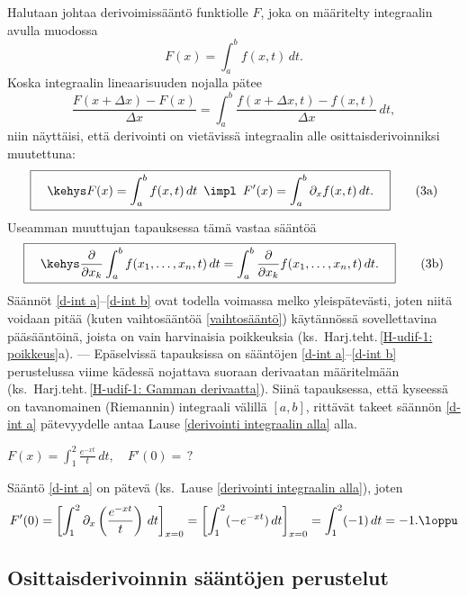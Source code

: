 Halutaan johtaa derivoimissääntö funktiolle $F$, joka on määritelty integraalin avulla muodossa
\[
F(x) = \int_a^b f(x,t)\,dt.
\]
Koska integraalin lineaarisuuden nojalla pätee
\[
\frac{F(x+\Delta x)-F(x)}{\Delta x} = \int_a^b \frac{f(x+\Delta x,t)-f(x,t)}{\Delta x}\,dt,
\]
niin näyttäisi, että derivointi on vietävissä integraalin alle osittaisderivoinniksi 
muutettuna:
\begin{equation} \label{d-int a}
\boxed{\quad\kehys F(x) =\int_a^b f(x,t)\,dt\,\ \impl\,\ 
                   F'(x)=\int_a^b \partial_x f(x,t)\,dt. \quad} \tag{3a}
\end{equation}
Useamman muuttujan tapauksessa tämä vastaa sääntöä
\begin{equation} \label{d-int b}
\boxed{\quad\kehys \frac{\partial}{\partial x_k}\int_a^b f(x_1,\ldots,x_n,t)\,dt 
              = \int_a^b \frac{\partial}{\partial x_k}f(x_1,\ldots,x_n,t)\,dt. \quad} \tag{3b}
\end{equation}
Säännöt \eqref{d-int a}--\eqref{d-int b} ovat todella voimassa melko yleispätevästi, joten
niitä voidaan pitää (kuten vaihtosääntöä \eqref{vaihtosääntö}) käytännössä sovellettavina
pääsääntöinä, joista on vain harvinaisia poikkeuksia 
(ks.\ Harj.teht.\,\ref{H-udif-1: poikkeus}a). --- Epäselvissä tapauksissa on sääntöjen
\eqref{d-int a}--\eqref{d-int b} perustelussa viime kädessä nojattava suoraan derivaatan
määritelmään (ks.\ Harj.teht.\,\ref{H-udif-1: Gamman derivaatta}). Siinä tapauksessa, että
kyseessä on tavanomainen (Riemannin) integraali välillä $[a,b]$, rittävät takeet säännön
\eqref{d-int a} pätevyydelle antaa Lause \ref{derivointi integraalin alla} alla.
\begin{Exa} $\displaystyle{F(x)=\int_1^2 \frac{e^{-xt}}{t}\,dt, \quad F'(0)=\,?}$ 
\end{Exa}
\ratk Sääntö \eqref{d-int a} on pätevä (ks.\ Lause \ref{derivointi integraalin alla}), joten
\[
F'(0)= \left[\int_1^2 \partial_x\left(\frac{e^{-xt}}{t}\right)\,dt\right]_{x=0} 
     = \left[\int_1^2(-e^{-xt})\,dt\right]_{x=0} = \int_1^2 (-1)\,dt = -1. \loppu
\]

\subsection{Osittaisderivoinnin sääntöjen perustelut}

